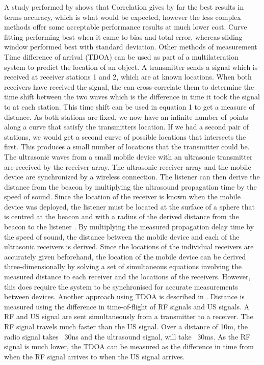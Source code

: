 \documentclass[]{final_report}
\begin{document}
A study performed by \cite{barshan2000fast} shows that Correlation gives by far the best results in terms accuracy, which is what would be expected, however the less complex methods offer some acceptable performance results at much lower cost. Curve fitting performing best when it came to bias and total error, whereas sliding window performed best with standard deviation.
Other methods of measurement 
Time difference of arrival (TDOA) can be used as part of a multilateration system to predict the location of an object. A transmitter sends a signal which is received at receiver stations 1 and 2, which are at known locations. When both receivers have received the signal, the can cross-correlate them to determine the time shift between the two waves which is the difference in time it took the signal to at each station. This time shift can be used in equation 1 to get a measure of distance. As both stations are fixed, we now have an infinite number of points along a curve that satisfy the transmitters location. If we had a second pair of stations, we would get a second curve of possible locations that intersects the first. This produces a small number of locations that the transmitter could be.  
The ultrasonic waves from a small mobile device with an ultrasonic transmitter are received by the receiver array. The ultrasonic receiver array and the mobile device are synchronized by a wireless connection. The listener can then derive the distance from the beacon by multiplying the ultrasound propagation time by the speed of sound. Since the location of the receiver is known when the mobile device was deployed, the listener must be located at the surface of a sphere that is centred at the beacon and with a radius of the derived distance from the beacon to the listener \cite{hsiao2008two}. By multiplying the measured propagation delay time by the speed of sound, the distance between the mobile device and each of the ultrasonic receivers is derived. Since the locations of the individual receivers are accurately given beforehand, the location of the mobile device can be derived three-dimensionally by solving a set of simultaneous equations involving the measured distance to each receiver and the locations of the receivers. \cite{minami2007design} However, this does require the system to be synchronised for accurate measurements between devices.
Another approach using TDOA is described in \cite{piontek2007improving}. Distance is measured using the difference in time-of-ﬂight of RF signals and US signals. A RF and US signal are sent simultaneously from a transmitter to a receiver. The RF signal travels much faster than the US signal. Over a distance of 10m, the radio signal takes ~30ns and the ultrasound signal, will take ~30ms. As the RF signal is much lower, the TDOA can be measured as the difference in time from when the RF signal arrives to when the US signal arrives. 
\end{document}
